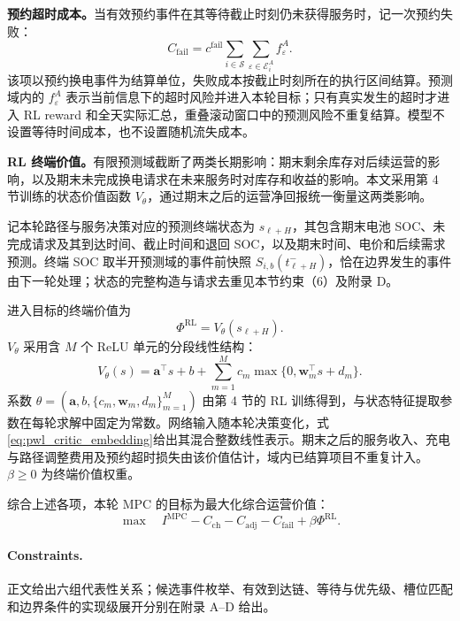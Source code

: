 \documentclass[12pt,a4paper,UTF8]{ctexart}
\begin{document}
\textbf{预约超时成本。}当有效预约事件在其等待截止时刻仍未获得服务时，记一次预约失败：
\begin{equation}
C_{\mathrm{fail}}
=
c^{\mathrm{fail}}
\sum_{i\in\mathcal S}
\sum_{\varepsilon\in\mathcal E_{i}^{A}}
f_\varepsilon^A.
\label{eq:reservation_failure_cost}
\end{equation}
该项以预约换电事件为结算单位，失败成本按截止时刻所在的执行区间结算。预测域内的 $f_\varepsilon^A$ 表示当前信息下的超时风险并进入本轮目标；只有真实发生的超时才进入 RL reward 和全天实际汇总，重叠滚动窗口中的预测风险不重复结算。模型不设置等待时间成本，也不设置随机流失成本。

\textbf{RL 终端价值。}有限预测域截断了两类长期影响：期末剩余库存对后续运营的影响，以及期末未完成换电请求在未来服务时对库存和收益的影响。本文采用第 4 节训练的状态价值函数 $V_\theta$，通过期末之后的运营净回报统一衡量这两类影响。

记本轮路径与服务决策对应的预测终端状态为 $s_{\ell+H}$，其包含期末电池 SOC、未完成请求及其到达时间、截止时间和退回 SOC，以及期末时间、电价和后续需求预测。终端 SOC 取半开预测域的事件前快照 $S_{i,b}(t_{\ell+H}^{-})$，恰在边界发生的事件由下一轮处理；状态的完整构造与请求去重见本节约束（6）及附录 D。

进入目标的终端价值为
\begin{equation}
\Phi^{\mathrm{RL}}
=V_\theta\!\left(s_{\ell+H}\right).
\label{eq:rl_terminal_value}
\end{equation}
$V_\theta$ 采用含 $M$ 个 ReLU 单元的分段线性结构：
\begin{equation}
V_\theta(s)
=\boldsymbol a^\top s+b
+\sum_{m=1}^{M}c_m
\max\{0,\boldsymbol w_m^\top s+d_m\}.
\label{eq:pwl_critic}
\end{equation}
系数 $\theta=(\boldsymbol a,b,\{c_m,\boldsymbol w_m,d_m\}_{m=1}^{M})$ 由第 4 节的 RL 训练得到，与状态特征提取参数在每轮求解中固定为常数。网络输入随本轮决策变化，式\eqref{eq:pwl_critic_embedding}给出其混合整数线性表示。期末之后的服务收入、充电与路径调整费用及预约超时损失由该价值估计，域内已结算项目不重复计入。$\beta\ge0$ 为终端价值权重。

综合上述各项，本轮 MPC 的目标为最大化综合运营价值：
\begin{equation}
\max\quad
I^{\mathrm{MPC}}-C_{\mathrm{ch}}-C_{\mathrm{adj}}-C_{\mathrm{fail}}
+\beta\Phi^{\mathrm{RL}}.
\label{eq:objective}
\end{equation}

\paragraph{Constraints.}
正文给出六组代表性关系；候选事件枚举、有效到达链、等待与优先级、槽位匹配和边界条件的实现级展开分别在附录 A--D 给出。
\end{document}
